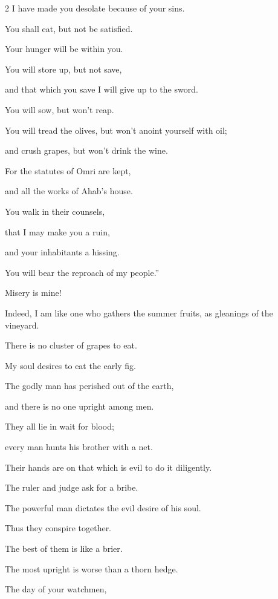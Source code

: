 \begin{multicols}{2}
I have made you desolate because of your sins.

\myverse{}You shall eat, but not be satisfied.

Your hunger will be within you.

You will store up, but not save,

and that which you save I will give up to the sword.

\myverse{}You will sow, but won’t reap.

You will tread the olives, but won’t anoint yourself with oil;

and crush grapes, but won’t drink the wine.

\myverse{}For the statutes of Omri are kept,

and all the works of Ahab’s house.

You walk in their counsels,

that I may make you a ruin,

and your inhabitants a hissing.

You will bear the reproach of my people.”

\mychapter{} \myverse*{}Misery is mine!

Indeed, I am like one who gathers the summer fruits, as gleanings of the vineyard.

There is no cluster of grapes to eat.

My soul desires to eat the early fig.

\myverse{}The godly man has perished out of the earth,

and there is no one upright among men.

They all lie in wait for blood;

every man hunts his brother with a net.

\myverse{}Their hands are on that which is evil to do it diligently.

The ruler and judge ask for a bribe.



\noindent The powerful man dictates the evil desire of his soul.

Thus they conspire together.

\myverse{}The best of them is like a brier.

The most upright is worse than a thorn hedge.

The day of your watchmen,


\end{multicols}
